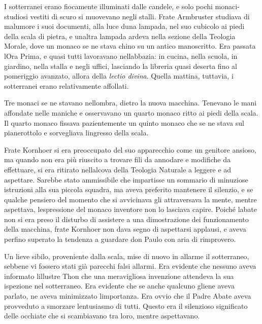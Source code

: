 I sotterranei erano fiocamente illuminati dalle candele, e solo pochi
monaci-studiosi vestiti di scuro si muovevano negli stalli. Frate
Armbruster studiava di malumore i suoi documenti, alla luce
d\textquotesingle una lampada, nel suo cubicolo ai piedi della scala di
pietra, e un\textquotesingle altra lampada ardeva nella sezione della
Teologia Morale, dove un monaco se ne stava chino su un antico
manoscritto. Era passata l\textquotesingle Ora Prima, e quasi tutti
lavoravano nell\textquotesingle abbazia: in cucina, nella scuola, in
giardino, nella stalla e negli uffici, lasciando la libreria quasi
deserta fino al pomeriggio avanzato, all\textquotesingle ora della
\emph{lectio divina}. Quella mattina, tuttavia, i sotterranei erano
relativamente affollati.

Tre monaci se ne stavano nell\textquotesingle ombra, dietro la nuova
macchina. Tenevano le mani affondate nelle maniche e osservavano un
quarto monaco ritto ai piedi della scala. Il quarto monaco fissava
pazientemente un quinto monaco che se ne stava sul pianerottolo e
sorvegliava l\textquotesingle ingresso della scala.

Frate Kornhoer si era preoccupato del suo apparecchio come un genitore
ansioso, ma quando non era più riuscito a trovare fili da annodare e
modifiche da effettuare, si era ritirato nell\textquotesingle alcova
della Teologia Naturale a leggere e ad aspettare. Sarebbe stato
ammissibile che impartisse un sommario di minuziose istruzioni alla sua
piccola squadra, ma aveva preferito mantenere il silenzio, e se qualche
pensiero del momento che si avvicinava gli attraversava la mente, mentre
aspettava, l\textquotesingle espressione del monaco inventore non lo
lasciava capire. Poiché l\textquotesingle abate non si era preso il
disturbo di assistere a una dimostrazione dei funzionamento della
macchina, frate Kornhoer non dava segno di aspettarsi applausi, e aveva
perfino superato la tendenza a guardare don Paulo con aria di
rimprovero.

Un lieve sibilo, proveniente dalla scala, mise di nuovo in allarme il
sotterraneo, sebbene vi fossero stati già parecchi falsi allarmi. Era
evidente che nessuno aveva informato l\textquotesingle illustre Thon che
una meravigliosa invenzione attendeva la sua ispezione nel sotterraneo.
Era evidente che se anche qualcuno gliene aveva parlato, ne aveva
minimizzato l\textquotesingle importanza. Era ovvio che il Padre Abate
aveva provveduto a smorzare l\textquotesingle entusiasmo di tutti.
Questo era il silenzioso significato delle occhiate che si scambiavano
tra loro, mentre aspettavano.

